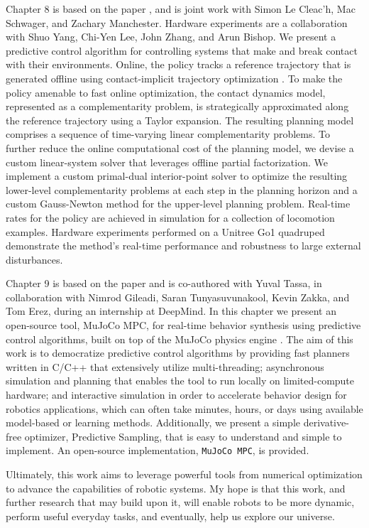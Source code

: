 Chapter 8 is based on the paper \cite{lecleach2021fast}, and is joint work with Simon Le Cleac'h, Mac Schwager, and Zachary Manchester. Hardware experiments are a collaboration with Shuo Yang, Chi-Yen Lee, John Zhang, and Arun Bishop. We present a predictive control algorithm for controlling systems that make and break contact with their environments. Online, the policy tracks a reference trajectory that is generated offline using contact-implicit trajectory optimization \cite{manchester2020variational}. To make the policy amenable to fast online optimization, the contact dynamics model, represented as a complementarity problem, is strategically approximated along the reference trajectory using a Taylor expansion. The resulting planning model comprises a sequence of time-varying linear complementarity problems. To further reduce the online computational cost of the planning model, we devise a custom linear-system solver that leverages offline partial factorization. We implement a custom primal-dual interior-point solver to optimize the resulting lower-level complementarity problems at each step in the planning horizon and a custom Gauss-Newton method for the upper-level planning problem. Real-time rates for the policy are achieved in simulation for a collection of locomotion examples. Hardware experiments performed on a Unitree Go1 quadruped \cite{unitree_go1} demonstrate the method's real-time performance and robustness to large external disturbances.

Chapter 9 is based on the paper \cite{howell2022predictive} and is co-authored with Yuval Tassa, in collaboration with Nimrod Gileadi, Saran Tunyasuvunakool, Kevin Zakka, and Tom Erez, during an internship at DeepMind. In this chapter we present an open-source tool, MuJoCo MPC, for real-time behavior synthesis using predictive control algorithms, built on top of the MuJoCo physics engine \cite{todorov2012mujoco}. The aim of this work is to democratize predictive control algorithms by providing fast planners written in C/C++ that extensively utilize multi-threading; asynchronous simulation and planning that enables the tool to run locally on limited-compute hardware; and interactive simulation in order to accelerate behavior design for robotics applications, which can often take minutes, hours, or days using available model-based or learning methods. Additionally, we present a simple derivative-free optimizer, Predictive Sampling, that is easy to understand and simple to implement. An open-source implementation, \texttt{MuJoCo MPC}, is provided. 

Ultimately, this work aims to leverage powerful tools from numerical optimization to advance the capabilities of robotic systems. My hope is that this work, and further research that may build upon it, will enable robots to be more dynamic, perform useful everyday tasks, and eventually, help us explore our universe.

\pagebreak



